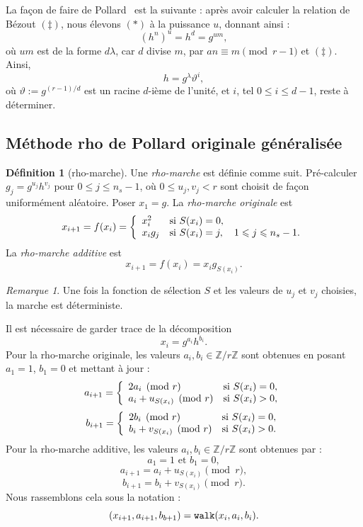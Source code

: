 \documentclass[a4paper, titlepage]{article}
\theoremstyle{definition}
\newtheorem{defi}[theo]{Définition}
\theoremstyle{remark}
\newtheorem{rema}[theo]{Remarque}
\def\Z{\mathbb Z}
\begin{document}
La façon de faire de Pollard~\cite{pollard1978} est la suivante : après avoir calculer la relation de Bézout $(\ddagger)$, nous élevons $(\ast)$ à la puissance $u$, donnant ainsi :
$${(h^n)}^u = h^d = g^{um},$$
où $um$ est de la forme $d\lambda$, car $d$ divise $m$, par $an \equiv m \pmod{r-1}$ et $(\ddagger)$. Ainsi,
$$h = g^\lambda \vartheta^i,$$
où $\vartheta := g^{(r-1)/d}$ est un racine $d$-ième de l'unité, et $i$, tel $0\leqslant i \leqslant d-1$, reste à déterminer.

\subsection{Méthode rho de Pollard originale généralisée}

\begin{defi}[rho-marche]
Une \textit{rho-marche} est définie comme suit. Pré-calculer $g_j = g^{u_j}h^{v_j}$ pour $0 \leqslant j \leqslant n_s -1$, où $ 0\leqslant u_j, v_j < r$ sont choisit de façon uniformément aléatoire. Poser $x_1 = g$. La \textit{rho-marche originale} est 
$$x_{i+1} = f(x_i) = \left\{ \begin{array}{l l}
x_i^2 & \text{si } S(x_i) = 0,\\
x_ig_j & \text{si } S(x_i) = j, \quad 1 \leqslant j \leqslant n_s-1.
\end{array} \right.$$
La \textit{rho-marche additive} est
$$x_{i+1} = f(x_i) = x_ig_{S(x_i)}.$$
\end{defi}

\begin{rema}
Une fois la fonction de sélection $S$ et les valeurs de $u_j$ et $v_j$ choisies, la marche est déterministe.
\end{rema}

Il est nécessaire de garder trace de la décomposition 
$$x_i = g^{a_i}h^{b_i}.$$ 
Pour la rho-marche originale, les valeurs $a_i, b_i \in \Z/r\Z$ sont obtenues en posant $a_1 = 1$, $b_1 = 0$ et mettant à jour :
$$a_{i+1} = \left\{\begin{array}{l l}
2a_i \pmod{r} & \text{si } S(x_i) = 0, \\
a_i + u_{S(x_i)} \pmod{r} & \text{si } S(x_i) > 0, \\
\end{array}\right.$$
$$b_{i+1} = \left\{\begin{array}{l l}
2b_i \pmod{r} & \text{si } S(x_i) = 0, \\
b_i + v_{S(x_i)} \pmod{r} & \text{si } S(x_i) > 0. \\
\end{array}\right.$$
Pour la rho-marche additive, les valeurs $a_i, b_i \in \Z/r\Z$ sont obtenues par :
$$a_1 = 1\text{ et } b_1 = 0,$$
$$a_{i+1} = a_i + u_{S(x_i)} \pmod{r}, $$
$$b_{i+1} = 
b_i + v_{S(x_i)} \pmod{r}.$$
Nous rassemblons cela sous la notation :
$$(x_{i+1}, a_{i+1}, b_{b+1}) = \verb|walk| (x_i, a_i, b_i).$$
\end{document}
